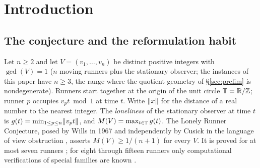 \begin{abstract}
theorem---the sum-only equality $M(V)=\max_{\{u,w\}}\tau(u,w)$, the
rigid-zone translate-class classifications at the primes
$7,11,13,17,19,37$, and the composite-side structure at $p^2$ and $pq$,
stated with their hypothesis ledger---and a finite witness archive with a
certification ladder: exact deepest-hole classification at $n=3$,
independent away-certified and branch-and-bound certificates at $n=4$
(newly including $v=(1,2,3,16)$, $\rho=9/34$), exact refutations at
$n=5,6$, and, from this session's independent branch-and-bound method,
certified deepest-hole equality at $n=5$, $m=20,25,30$
($\rho=\delta$ exactly at each) together with one serious attempt at the
remaining $m=10$ case, whose unresolved residual has volume below
$6\times10^{-7}$ with exact interior depths strictly below the claimed
value. Every number cited in this abstract is re-asserted by a persisted,
independent, exact computation (a 225-item ledger with zero failures), and
the certification method carries a negative control that correctly
refuses a false statement.
The paper is a negative-results paper and claims no progress on the
conjecture itself: it proves no new cases of $\lrc$, and the surviving
equivalent forms are as hard as they ever were. What it contributes is the
obstruction's anatomy: why four natural toolkits, each correct and each
productive on its own terms, cannot cross the same gap.
\end{abstract}

\section{Introduction}\label{sec:intro}

\subsection{The conjecture and the reformulation habit}

Let $n\ge 2$ and let $V=(v_1,\dots,v_n)$ be distinct positive integers
with $\gcd(V)=1$ ($n$ moving runners plus the stationary observer; the
instances of this paper have $n\ge 3$, the range where the quotient
geometry of \S\ref{sec:prelim} is nondegenerate). Runners start together
at the origin of the unit circle
$\mathbb{T}=\mathbb{R}/\mathbb{Z}$; runner $p$ occupies $v_p t \bmod 1$ at time $t$. Write
$\lVert x \rVert$ for the distance of a real number to the nearest integer. The
\emph{loneliness} of the stationary observer at time $t$ is
$g(t)=\min_{1\le p\le n}\lVert v_p t \rVert$, and $M(V)=\max_{t\in\mathbb{T}}g(t)$. The
Lonely Runner Conjecture, posed by Wills in 1967 and independently by
Cusick in the language of view obstruction
\cite{PS-survey,Wills,Cusick1973}, asserts $M(V)\ge 1/(n{+}1)$ for every
$V$. It is proved for at most seven runners \cite{PS-survey}; for eight
through fifteen runners only computational verifications of special
families are known
\cite{Rosenfeld8,Trakulthongchai,Sungkawichai,Allikvere,MSS}.

